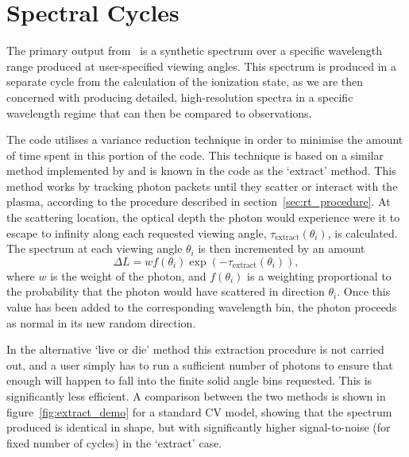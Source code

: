 \section{Spectral Cycles}
\label{sec:spectral_cycles}
The primary output from \py\ is a synthetic spectrum over a specific wavelength
range produced at user-specified viewing angles. This spectrum is produced 
in a separate cycle from the calculation of the ionization state, as we are then concerned
with producing detailed, high-resolution spectra in a specific wavelength regime
that can then be compared to observations.

The code utilises a variance reduction technique in order to minimise the amount of 
time spent in this portion of the code. This technique is based 
on a similar method implemented by \cite{woods1991} and is known in the code
as the `extract' method. This method works by 
tracking photon packets until they scatter or interact with the plasma, according
to the procedure described in section~\ref{sec:rt_procedure}. 
At the scattering location, the optical depth the photon would
experience were it to escape to infinity along each requested viewing angle, 
$\tau_{\mathrm{extract}}(\theta_i)$, is calculated. The spectrum at each 
viewing angle $\theta_i$ is then incremented by an amount
\begin{equation}
\Delta L = w f(\theta_i) \exp(-\tau_{\mathrm{extract}}(\theta_i)),
\end{equation}
where $w$ is the weight of the photon, and $f(\theta_i)$ is a weighting proportional to
the probability that the photon would have scattered in direction $\theta_i$. Once this
value has been added to the corresponding wavelength bin, the photon
proceeds as normal in its new random direction.

In the alternative `live or die' method this extraction procedure is not
carried out, and a user simply has to run a sufficient number of 
photons to ensure that enough will happen
to fall into the finite solid angle bins requested. This is significantly
less efficient. A comparison between the two methods is shown in 
figure~\ref{fig:extract_demo} for a standard CV model, showing that the spectrum 
produced is identical in shape, but with significantly higher signal-to-noise (for
fixed number of cycles) in the `extract' case.

